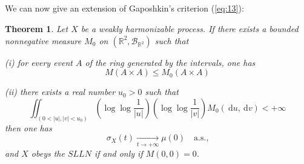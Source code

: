 \documentclass{article}
\newtheorem{theorem}{Theorem}
\theoremstyle{definition}
\begin{document}
\subsection{}

We can now give an extension of Gaposhkin's criterion (\ref{eq:13}):

\begin{theorem}\label{thm:3}
Let $X$ be a weakly harmonizable process. If there exists a bounded nonnegative measure $M_{0}$ on $(\mathbb{R}^{2}, \mathscr{B}_{\mathbb{R}^{2}})$ such that

(i) for every event $A$ of the ring generated by the intervals, one has
\begin{equation}\label{eq:33}
M(A \times A) \leqslant M_{0}(A \times A)
\end{equation}

(ii) there exists a real number $u_{0}>0$ such that
\begin{equation}\label{eq:34}
\iint_{\left(0<|u|,|v|<u_{0}\right)}\left(\log \log \frac{1}{|u|}\right)\left(\log \log \frac{1}{|v|}\right) M_{0}(\mathrm{~d} u, \mathrm{~d} v)<+\infty
\end{equation}
then one has
\begin{equation}\label{eq:35}
\sigma_{X}(t) \underset{t \rightarrow+\infty}{\longrightarrow} \mu(0) \quad \text{a.s.,}
\end{equation}
and $X$ obeys the $SLLN$ if and only if $M(0,0)=0$.
\end{theorem}
\end{document}
